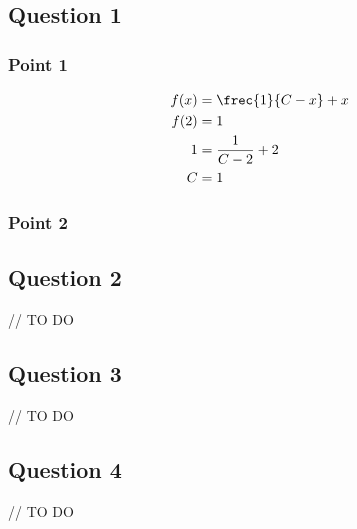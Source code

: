 \subsection{Question 1}

\subsubsection{Point 1}

\begin{equation}
	\begin{aligned}
		f(x) &= \frec{1}{C - x} + x\\
		f(2) &= 1\\
		1 &= \frac{1}{C - 2} + 2\\
		C &= 1
	\end{aligned}
\end{equation}

\subsubsection{Point 2}

\subsection{Question 2}

// TO DO

\subsection{Question 3}

// TO DO

\subsection{Question 4}

// TO DO
